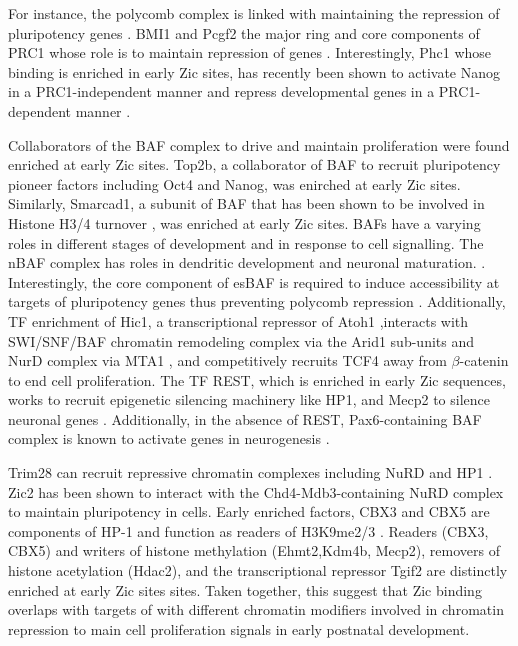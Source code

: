 \documentclass[fleqn,10pt,twocolumn]{wlscirep}
\begin{document}
For instance, the polycomb complex is linked with maintaining the repression of pluripotency genes \cite{Riising2014GeneWide}. BMI1 and Pcgf2 the major ring  and core components of PRC1 whose role is to maintain repression of genes \cite{Aranda2015RegulationProteins}. Interestingly, Phc1 whose binding is enriched in early Zic sites, has recently been shown to activate  Nanog in a PRC1-independent manner and repress developmental genes in a PRC1-dependent manner \cite{Chen2021Phc1Locus}. 

Collaborators of the BAF complex to drive and maintain proliferation were found enriched at early Zic sites. Top2b, a collaborator of BAF to recruit pluripotency pioneer factors including Oct4 and Nanog, was enirched at early Zic sites. Similarly,  Smarcad1, a subunit of BAF that has been shown to be involved in Histone H3/4 turnover \cite{Markert2021Smarcad1Activity}, was  enriched at early Zic sites. BAFs have a varying roles in different stages of development and in response to cell signalling. The nBAF complex has roles in dendritic development and neuronal maturation. \cite{Alfert2019TheDisease}. Interestingly, the core component of esBAF is required to induce accessibility at targets of pluripotency genes thus preventing polycomb repression \cite{Ho2011EsBAFFunction}.  Additionally, TF enrichment of Hic1, a transcriptional repressor of Atoh1 \cite{Briggs2008CooperationMedulloblastoma },interacts with SWI/SNF/BAF chromatin remodeling complex via the Arid1 sub-units and NurD complex via MTA1 \cite{VanRechem2009HIC1ARID1A/BAF250A, VanRechem2010DifferentialCells}, and competitively recruits TCF4 away from $\beta$-catenin \cite{Valenta2006HIC1bodies} to end cell proliferation. The TF REST, which is enriched in early Zic sequences, works to recruit epigenetic silencing machinery like HP1, and Mecp2 to silence neuronal genes \cite{Ballas2005TheGenes}. Additionally, in the absence of REST, Pax6-containing BAF complex is known to activate genes in neurogenesis \cite{Ninkovic2013TheNetwork, Tuoc2013ChromatinThickness}. 




Trim28 can recruit repressive chromatin complexes including NuRD and HP1 \cite{Sripathy2006TheRepression}. Zic2 has been shown to interact with the Chd4-Mdb3-containing NuRD complex to maintain pluripotency in cells\cite{Luo2015Zic2Specification}. Early enriched factors, CBX3 and CBX5 are components of HP-1 and function as readers of H3K9me2/3 \cite{vanWijnen2021BiologicalDevelopment}. Readers (CBX3, CBX5) and writers of histone methylation  (Ehmt2,Kdm4b, Mecp2),  removers of histone acetylation (Hdac2), and the transcriptional repressor Tgif2  are distinctly enriched at early Zic sites sites. Taken together, this suggest that Zic binding overlaps with targets of with different chromatin modifiers involved in chromatin repression to main cell proliferation signals in early postnatal development. 
\end{document}
